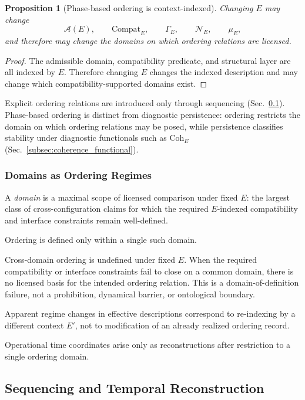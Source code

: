 \documentclass[aps,prx,onecolumn,11pt]{revtex4-2}
\theoremstyle{plain}
\newtheorem{proposition}{Proposition}
\theoremstyle{definition}
\theoremstyle{remark}
\begin{document}
\begin{proposition}[Phase-based ordering is context-indexed]
\label{prop:phase_order_context_indexed}
Changing \(E\) may change
\[
\mathcal A(E),
\qquad
\mathrm{Compat}_E,
\qquad
\Gamma_E,
\qquad
\mathcal N_E,
\qquad
\mu_E,
\]
and therefore may change the domains on which ordering relations are
licensed.
\end{proposition}

\begin{proof}
The admissible domain, compatibility predicate, and structural layer are
all indexed by \(E\). Therefore changing \(E\) changes the indexed
description and may change which compatibility-supported domains exist.
\end{proof}

Explicit ordering relations are introduced only through sequencing
(Sec.~\ref{subsec:sequencing_and_time_reconstruction}). Phase-based
ordering is distinct from diagnostic persistence: ordering restricts the
domain on which ordering relations may be posed, while persistence
classifies stability under diagnostic functionals such as
\(\mathrm{Coh}_E\)
(Sec.~\ref{subsec:coherence_functional}).

\subsubsection{Domains as Ordering Regimes}
\label{subsubsec:domains_ordering_regimes}

A \emph{domain} is a maximal scope of licensed comparison under fixed
\(E\): the largest class of cross-configuration claims for which the
required \(E\)-indexed compatibility and interface constraints remain
well-defined.

Ordering is defined only within a single such domain.

Cross-domain ordering is undefined under fixed \(E\). When the required
compatibility or interface constraints fail to close on a common domain,
there is no licensed basis for the intended ordering relation. This is a
domain-of-definition failure, not a prohibition, dynamical barrier, or
ontological boundary.

Apparent regime changes in effective descriptions correspond to
re-indexing by a different context \(E'\), not to modification of an
already realized ordering record.

Operational time coordinates arise only as reconstructions after
restriction to a single ordering domain.

\subsection{Sequencing and Temporal Reconstruction}
\label{subsec:sequencing_and_time_reconstruction}
\end{document}
